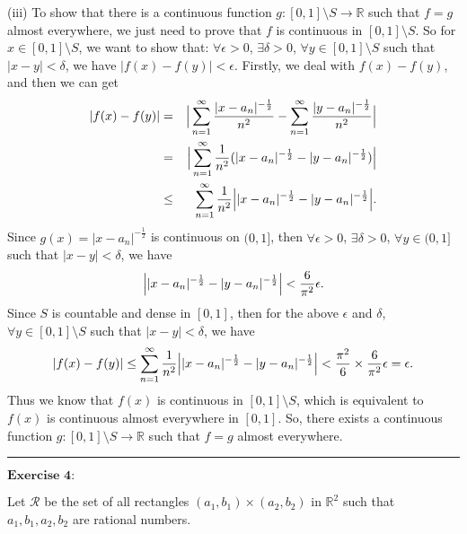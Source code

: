 \documentclass[12pt]{article}
\begin{document}
(iii) To show that there is a continuous function $g : [0, 1] \setminus S \rightarrow \mathbb{R}$ such that $f = g$ almost everywhere, we just need to prove that $f$ is continuous in $[0, 1] \setminus S$. So for $x \in [0, 1] \setminus S$, we want to show that: $\forall \epsilon > 0$, $\exists \delta > 0$, $\forall y \in [0, 1] \setminus S$ such that $|x - y| < \delta$, we have $|f(x) - f(y)| < \epsilon$. Firstly, we deal with $f(x) - f(y)$, and then we can get
\begin{eqnarray*}
|f(x) - f(y)| & =& \Big{|} \sum_{n = 1}^{\infty} \frac{|x - a_{n}|^{- \frac{1}{2}}}{n^{2}} - \sum_{n = 1}^{\infty} \frac{|y - a_{n}|^{- \frac{1}{2}}}{n^{2}} \Big{|} \\
& = &  \Big{|} \sum_{n = 1}^{\infty} \frac{1}{n^{2}} (|x - a_{n}|^{- \frac{1}{2}} - |y - a_{n}|^{- \frac{1}{2}}) \Big{|} \\
& \leq & \sum_{n = 1}^{\infty} \frac{1}{n^{2}}  \Big{|} |x - a_{n}|^{- \frac{1}{2}} - |y - a_{n}|^{- \frac{1}{2}} \Big{|}.
\end{eqnarray*}
Since $g(x) = |x - a_{n}|^{- \frac{1}{2}}$ is continuous on $(0, 1]$, then $\forall \epsilon > 0$, $\exists \delta > 0$, $\forall y \in (0, 1]$ such that $|x - y| < \delta$, we have 
\begin{equation*}
   \Big{|} |x - a_{n}|^{- \frac{1}{2}} - |y - a_{n}|^{- \frac{1}{2}} \Big{|} < \frac{6}{\pi^{2}} \epsilon.
\end{equation*}
Since $S$ is countable and dense in $[0, 1]$, then for the above $\epsilon$ and $\delta$, $\forall y \in [0, 1] \setminus S$ such that $|x - y| < \delta$, we have
\begin{equation*}
   |f(x) - f(y)| \leq \sum_{n = 1}^{\infty} \frac{1}{n^{2}}  \Big{|} |x - a_{n}|^{- \frac{1}{2}} - |y - a_{n}|^{- \frac{1}{2}} \Big{|} < \frac{\pi^{2}}{6} \times \frac{6}{\pi^{2}} \epsilon = \epsilon.
\end{equation*}
Thus we know that $f(x)$ is continuous in $[0, 1] \setminus S$, which is equivalent to $f(x)$ is continuous almost everywhere in $[0, 1]$. So, there exists a continuous function $g : [0, 1] \setminus S \rightarrow \mathbb{R}$ such that $f = g$ almost everywhere.


\noindent\rule[0.25\baselineskip]{\textwidth}{0.5pt}

\vspace{8pt}

$\textbf{Exercise 4:}$

Let $\mathcal{R}$ be the set of all rectangles $(a_{1}, b_{1}) \times (a_{2}, b_{2})$ in $\mathbb{R}^{2}$ such that $a_{1}, b_{1}, a_{2}, b_{2}$ are rational numbers.
\end{document}

